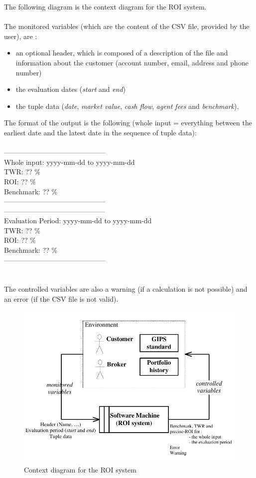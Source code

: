 \documentclass[runningheads,12pt]{article}
\begin{document}
The following diagram is the context diagram for the ROI system.\\
\\
The monitored variables (which are the content of the CSV file, provided by the user), are :
\begin{itemize}
\item an optional header, which is composed of a description of the file and information about the customer (account number, email, address and phone number)
\item the evaluation dates (\textit{start} and \textit{end})
\item the tuple data (\textit{date}, \textit{market value}, \textit{cash flow}, \textit{agent fees} and \textit{benchmark}).
\end{itemize}
\bigskip
The format of the output is the following (whole input = everything between the earliest date and the latest date in the sequence of tuple data):\\
\\
--------------------------------------------\\
Whole input: yyyy-mm-dd to yyyy-mm-dd\\
TWR: ?? \%\\
ROI: ?? \%\\
Benchmark: ?? \%\\
--------------------------------------------\\
--------------------------------------------\\
Evaluation Period: yyyy-mm-dd to yyyy-mm-dd\\
TWR: ?? \%\\
ROI: ?? \%\\
Benchmark: ?? \%\\
--------------------------------------------\\
\\
\\
The controlled variables are also a warning (if a calculation is not possible) and an error (if the CSV file is not valid).\\

\begin{figure}
\centering
\includegraphics[scale=1.0]{inputs/context.pdf}
\caption{Context diagram for the ROI system}
\label{fig:ROI-context}
\end{figure}
\end{document}
